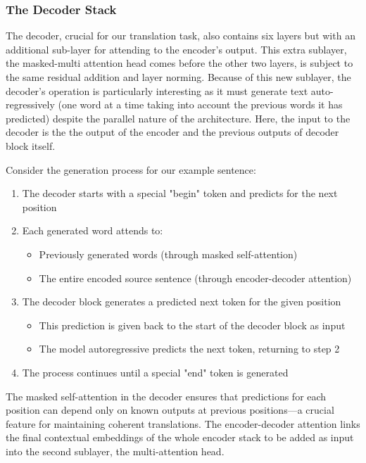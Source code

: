 \subsubsection{The Decoder Stack}
The decoder, crucial for our translation task, also contains six layers but with an additional sub-layer for attending to the encoder's output. This extra sublayer, the masked-multi attention head comes before the other two layers, is subject to the same residual addition and layer norming. Because of this new sublayer, the decoder's operation is particularly interesting as it must generate text auto-regressively (one word at a time taking into account the previous words it has predicted) despite the parallel nature of the architecture. Here, the input to the decoder is the the output of the encoder and the previous outputs of decoder block itself. 

Consider the generation process for our example sentence: \\
\begin{enumerate}
    \item The decoder starts with a special "begin" token and predicts for the next position
    \item Each generated word attends to:
    \begin{itemize}
        \item Previously generated words (through masked self-attention)
        \item The entire encoded source sentence (through encoder-decoder attention)
    \end{itemize}
        \item The decoder block generates a predicted next token for the given position
    \begin{itemize}
        \item This prediction is given back to the start of the decoder block as input
        \item The model autoregressive predicts the next token, returning to step 2 
    \end{itemize}
    \item The process continues until a special "end" token is generated
\end{enumerate}

The masked self-attention in the decoder ensures that predictions for each position can depend only on known outputs at previous positions—a crucial feature for maintaining coherent translations. The encoder-decoder attention links the final contextual embeddings of the whole encoder stack to be added as input into the second sublayer, the multi-attention head. 

